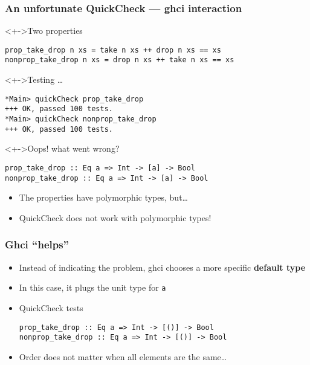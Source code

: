 \documentclass{beamer}
\begin{document}
\begin{frame}[fragile]
  \frametitle{An unfortunate QuickCheck --- ghci interaction}
  \begin{block}<+->{Two properties}
\begin{verbatim}
prop_take_drop n xs = take n xs ++ drop n xs == xs
nonprop_take_drop n xs = drop n xs ++ take n xs == xs
\end{verbatim}
  \end{block}
  \begin{block}<+->{Testing  \dots}
\begin{verbatim}
*Main> quickCheck prop_take_drop
+++ OK, passed 100 tests.
*Main> quickCheck nonprop_take_drop
+++ OK, passed 100 tests.
\end{verbatim}
  \end{block}
  \begin{block}<+->{Oops! what went wrong?}
\begin{verbatim}
prop_take_drop :: Eq a => Int -> [a] -> Bool
nonprop_take_drop :: Eq a => Int -> [a] -> Bool
\end{verbatim}
    \vspace{-\baselineskip}
    \begin{itemize}
    \item The properties have polymorphic types, but\dots
    \item QuickCheck does not work with polymorphic types!
    \end{itemize}
  \end{block}
\end{frame}
\begin{frame}[fragile]
  \frametitle{Ghci ``helps''}
  \begin{itemize}
  \item Instead of indicating the problem, ghci chooses a more specific \textbf{default type} 
  \item In this case, it plugs the unit type for \texttt{a}
  \item QuickCheck tests
\begin{verbatim}
prop_take_drop :: Eq a => Int -> [()] -> Bool
nonprop_take_drop :: Eq a => Int -> [()] -> Bool
\end{verbatim}
  \item Order does not matter when all elements are the same\dots
  \end{itemize}
\end{frame}
\end{document}
